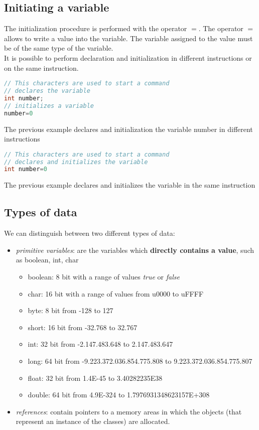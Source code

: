 \documentclass{article}
\begin{document}
\subsection{Initiating a variable}
The initialization procedure is performed with the operator $=$. The operator $=$ allows to write a value into the variable. The variable assigned to the value must be of the same type of the variable.\\
It is possible to perform declaration and initialization in different instructions or on the same instruction.
\begin{lstlisting}[language=Java,escapechar=|]
// This characters are used to start a command
// declares the variable
int number;
// initializes a variable
number=0
\end{lstlisting}
The previous example declares and initialization the  variable number in different instructions

\begin{lstlisting}[language=Java,escapechar=|]
// This characters are used to start a command
// declares and initializes the variable
int number=0
\end{lstlisting}
The previous example declares and initializes the variable in the same instruction

\subsection{Types of data}
We can distinguish between two different types of data:
\begin{itemize}
\item \emph{primitive variables}: are the variables which \textbf{directly contains a value}, such as boolean, int, char
\begin{itemize}
\item boolean: 8 bit with a range of values \emph{true} or \emph{false}
\item char: 16 bit with a range of values from u0000 to uFFFF
\item byte: 8 bit from -128 to 127
\item short: 16 bit from -32.768 to 32.767
\item int: 32 bit from -2.147.483.648 to 2.147.483.647
\item long: 64 bit from -9.223.372.036.854.775.808 to 9.223.372.036.854.775.807
\item float: 32 bit from 1.4E-45 to 3.40282235E38
\item double: 64 bit from 4.9E-324 to 1.7976931348623157E+308
\end{itemize}
\item \emph{references}: contain pointers to a memory areas in which the objects (that represent an instance of the classes) are allocated. 
\end{itemize}
\end{document}
